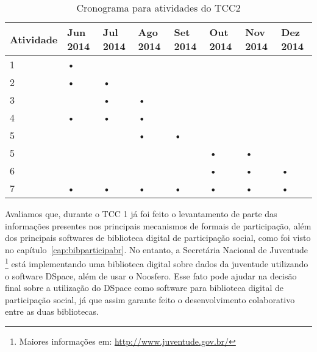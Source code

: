 \begin{table}[H]
\begin{center}
    \begin{tabular}{ | l | l | l | l | l | l | l | l |}
    \hline
    Atividade & Jun 2014 & Jul 2014 & Ago 2014 & Set 2014 & Out 2014 & Nov 2014 & Dez 2014 \\ \hline
    1 & • & & & & & & \\ \hline
    2 & • & • & & & & & \\ \hline
    3 & & • & • & & & & \\ \hline
    4 & • & • & • & & & & \\ \hline
    5 & & & • & • & & & \\ \hline
    5 & & & & & • & • & \\ \hline
    6 & & & & & • & • & • \\ \hline
    7 & • & • & • & • & • & • & • \\ \hline
    \end{tabular}
    \caption{Cronograma para atividades do TCC2}
    \label{tab-cronograma}
\end{center}
\end{table}


Avaliamos que, durante o TCC 1 já foi feito o levantamento de parte das informações presentes nos principais mecanismos de formais de participação, além dos principais softwares de biblioteca digital de participação social, como foi visto no capítulo~\ref{cap:bibparticipabr}. No entanto, a Secretária Nacional de Juventude \footnote{Maiores informações em: \url{http://www.juventude.gov.br/}} está implementando uma biblioteca digital sobre dados da juventude utilizando o software DSpace, além de usar o Noosfero. Esse fato pode ajudar na decisão final sobre a utilização do DSpace como software para biblioteca digital de participação social, já que assim garante feito o desenvolvimento colaborativo entre as duas bibliotecas.
 

